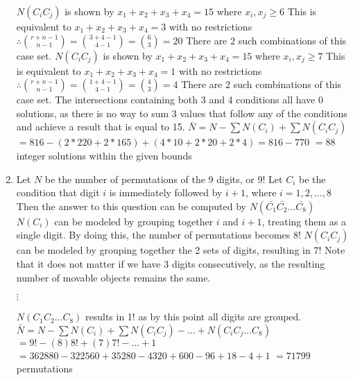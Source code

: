 \documentclass{article}
\begin{document}
\begin{enumerate}
		\newline $N(C_iC_j)$ is shown by $x_1+x_2+x_3+x_4=15$ where $x_i,x_j\geq6$
		\newline This is equivalent to $x_1+x_2+x_3+x_4=3$ with no restrictions
		\newline $\therefore {{r+n-1}\choose{n-1}}={{3+4-1}\choose{4-1}}={6\choose3}=20$
		\newline There are 2 such combinations of this case set.
		\newline $N(C_iC_j)$ is shown by $x_1+x_2+x_3+x_4=15$ where $x_i,x_j\geq7$
		\newline This is equivalent to $x_1+x_2+x_3+x_4=1$ with no restrictions
		\newline $\therefore {{r+n-1}\choose{n-1}}={{1+4-1}\choose{4-1}}={4\choose3}=4$
		\newline There are 2 such combinations of this case set.
		\newline
		\newline The intersections containing both 3 and 4 conditions all have 0 solutions, as there is no way to sum 3 values  that follow any of the conditions and achieve a result that is equal to 15.
		\newline
		\newline $\bar{N}=N-\sum N(C_i)+\sum N(C_iC_j)$
		\newline $=816-(2*220+2*165)+(4*10+2*20+2*4)=816-770$
		\newline $=88$ integer solutions within the given bounds
		
		\newpage
		\item Let $N$ be the number of permutations of the 9 digits, or 9!
		\newline Let $C_i$ be the condition that digit $i$ is immediately followed by $i+1$, where $i=1,2,\dots,8$
		\newline Then the answer to this question can be computed by $N(\bar{C_1}\bar{C_2}\dots\bar{C_8})$
		\newline
		\newline $N(C_i)$ can be modeled by grouping together $i$ and $i+1$, treating them as a single digit. By doing this, the number of permutations becomes 8!
		\newline $N(C_iC_j)$ can be modeled by grouping together the 2 sets of digits, resulting in 7! Note that it does not matter if we have 3 digits consecutively, as the resulting number of movable objects remains the same.
		\begin{center}
			$\vdots$
		\end{center}
		$N(C_1C_2\dots C_8)$ results in 1! as by this point all digits are grouped.
		\newline
		\newline $\bar{N}=N-\sum N(C_i)+\sum N(C_iC_j)-\dots+N(C_iC_j\dots C_8)$
		\newline $=9!-(8)8!+(7)7!-\dots+1$
		\newline $=362880-322560+35280-4320+600-96+18-4+1$
		\newline $=71799$ permutations
		

\end{enumerate}
\end{document}
